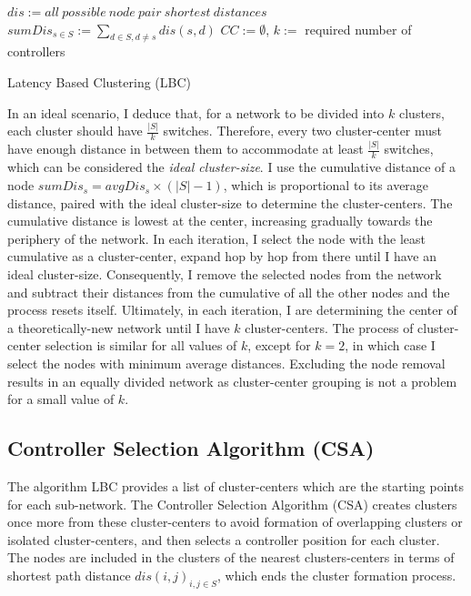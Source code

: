 \documentclass{IEEEtran}
\begin{document}
	\begin{algorithm}
		\SetAlgoLined
		$dis := all~possible~node~pair~shortest~distances$\;
		$sumDis_{s \in S} := \sum_{d \in S, d \ne s}dis(s,d)$\;
		$CC := \emptyset$, $k :=$ required number of controllers\;
		\caption{Latency Based Clustering (LBC)} \label{algo:lbc}
	\end{algorithm}

	In an ideal scenario, I deduce that, for a network to be divided into $k$ clusters, each cluster should have $\frac{|S|}{k}$ switches. Therefore, every two cluster-center must have enough distance in between them to accommodate at least $\frac{|S|}{k}$ switches, which can be considered the \textit{ideal cluster-size}. I use the cumulative distance of a node $sumDis_s = avgDis_s \times (|S|-1)$, which is proportional to its average distance, paired with the ideal cluster-size to determine the cluster-centers. The cumulative distance is lowest at the center, increasing gradually towards the periphery of the network. In each iteration, I select the node with the least cumulative as a cluster-center, expand hop by hop from there until I have an ideal cluster-size. Consequently, I remove the selected nodes from the network and subtract their distances from the cumulative of all the other nodes and the process resets itself. Ultimately, in each iteration, I are determining the center of a theoretically-new network until I have $k$ cluster-centers. The process of cluster-center selection is similar for all values of $k$, except for $k=2$, in which case I select the nodes with minimum average distances. Excluding the node removal results in an equally divided network as cluster-center grouping is not a problem for a small value of $k$.

	\subsection{Controller Selection Algorithm (CSA)} \label{csa}
	
	The algorithm LBC provides a list of cluster-centers which are the starting points for each sub-network. The Controller Selection Algorithm (CSA) creates clusters once more from these cluster-centers to avoid formation of overlapping clusters or isolated cluster-centers, and then selects a controller position for each cluster. The nodes are included in the clusters of the nearest clusters-centers in terms of shortest path distance $dis(i,j)_{i,j \in S}$, which ends the cluster formation process.
	
\end{document}
